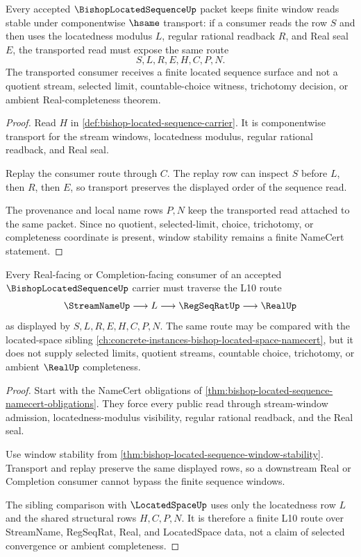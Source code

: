 \begin{theorem}
\label{thm:bishop-located-sequence-window-stability}
Every accepted $\BishopLocatedSequenceUp$ packet keeps finite window reads stable under componentwise $\hsame$ transport: if a consumer reads the row $S$ and then uses the locatedness modulus $L$, regular rational readback $R$, and Real seal $E$, the transported read must expose the same route
$$
S,L,R,E,H,C,P,N .
$$
The transported consumer receives a finite located sequence surface and not a quotient stream, selected limit, countable-choice witness, trichotomy decision, or ambient Real-completeness theorem.
\end{theorem}
\begin{proof}
Read $H$ in \autoref{def:bishop-located-sequence-carrier}. It is componentwise transport for the stream windows, locatedness modulus, regular rational readback, and Real seal.

Replay the consumer route through $C$. The replay row can inspect $S$ before $L$, then $R$, then $E$, so transport preserves the displayed order of the sequence read.

The provenance and local name rows $P,N$ keep the transported read attached to the same packet. Since no quotient, selected-limit, choice, trichotomy, or completeness coordinate is present, window stability remains a finite NameCert statement.
\end{proof}

\begin{theorem}
\label{thm:bishop-located-sequence-l10-route}
Every Real-facing or Completion-facing consumer of an accepted $\BishopLocatedSequenceUp$ carrier must traverse the L10 route
$$
\StreamNameUp \longrightarrow L \longrightarrow \RegSeqRatUp \longrightarrow \RealUp
$$
as displayed by $S,L,R,E,H,C,P,N$. The same route may be compared with the located-space sibling \autoref{ch:concrete-instances-bishop-located-space-namecert}, but it does not supply selected limits, quotient streams, countable choice, trichotomy, or ambient $\RealUp$ completeness.
\end{theorem}
\begin{proof}
Start with the NameCert obligations of \autoref{thm:bishop-located-sequence-namecert-obligations}. They force every public read through stream-window admission, locatedness-modulus visibility, regular rational readback, and the Real seal.

Use window stability from \autoref{thm:bishop-located-sequence-window-stability}. Transport and replay preserve the same displayed rows, so a downstream Real or Completion consumer cannot bypass the finite sequence windows.

The sibling comparison with $\LocatedSpaceUp$ uses only the locatedness row $L$ and the shared structural rows $H,C,P,N$. It is therefore a finite L10 route over StreamName, RegSeqRat, Real, and LocatedSpace data, not a claim of selected convergence or ambient completeness.
\end{proof}

